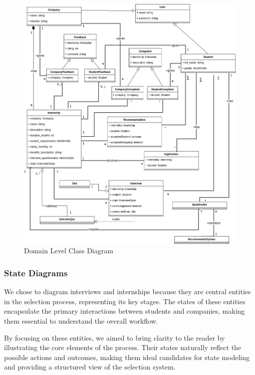 \begin{figure}[htbp]
\centering
\includegraphics[scale=0.45]{Images/class-diagram.png}
\caption{\label{fig:class-diagram} Domain Level Class Diagram}
\end{figure}

\subsubsection{State Diagrams}

We chose to diagram interviews and internships because they are central entities in the selection process, representing its key stages. The states of these entities encapsulate the primary interactions between students and companies, making them essential to understand the overall workflow.

By focusing on these entities, we aimed to bring clarity to the reader by illustrating the core elements of the process. Their states naturally reflect the possible actions and outcomes, making them ideal candidates for state modeling and providing a structured view of the selection system.

